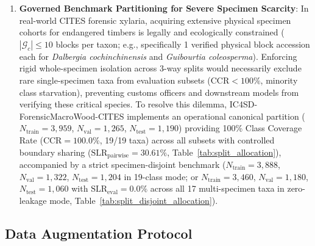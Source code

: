 \documentclass[a4paper,fleqn,12pt]{cas-sc}
\begin{document}
\begin{enumerate}[leftmargin=*,itemsep=2pt,topsep=2pt]
    \item \textbf{Governed Benchmark Partitioning for Severe Specimen Scarcity}: In real-world CITES forensic xylaria, acquiring extensive physical specimen cohorts for endangered timbers is legally and ecologically constrained ($|\mathcal{G}_c| \le 10$ blocks per taxon; e.g., specifically 1 verified physical block accession each for \textit{Dalbergia cochinchinensis} and \textit{Guibourtia coleosperma}). Enforcing rigid whole-specimen isolation across 3-way splits would necessarily exclude rare single-specimen taxa from evaluation subsets ($\text{CCR} < 100\%$, minority class starvation), preventing customs officers and downstream models from verifying these critical species. To resolve this dilemma, IC4SD-ForensicMacroWood-CITES implements an operational canonical partition ($N_{\text{train}} = 3,959$, $N_{\text{val}} = 1,265$, $N_{\text{test}} = 1,190$) providing 100\% Class Coverage Rate ($\text{CCR} = 100.0\%$, 19/19 taxa) across all subsets with controlled boundary sharing ($\text{SLR}_{\text{pairwise}} = 30.61\%$, Table~\ref{tab:split_allocation}), accompanied by a strict specimen-disjoint benchmark ($N_{\text{train}} = 3,888$, $N_{\text{val}} = 1,322$, $N_{\text{test}} = 1,204$ in 19-class mode; or $N_{\text{train}} = 3,460$, $N_{\text{val}} = 1,180$, $N_{\text{test}} = 1,060$ with $\text{SLR}_{\text{eval}} = 0.0\%$ across all 17 multi-specimen taxa in zero-leakage mode, Table~\ref{tab:split_disjoint_allocation}).
\end{enumerate}

\subsection{Data Augmentation Protocol}
\label{sec:data_augmentation}
\end{document}
